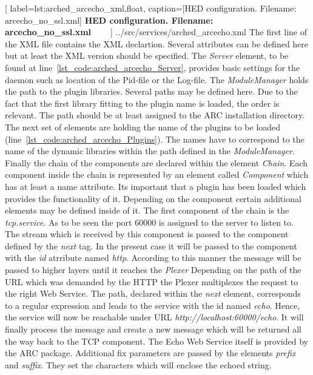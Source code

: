 
	[
	label=lst:arched_arcecho_xml,float,
	caption={[HED configuration. Filename: arcecho\_no\_ssl.xml]
	\textbf{HED configuration. Filename: arcecho\_no\_ssl.xml\textcolor{white}{hmf}}}
	]
{../src/services/arched_arcecho.xml}
The first line of the XML file contains the XML declartion. Several attributes can be defined here but at least the XML version should be specified.  %
The \textit{Server} element, to be found at line~\ref{lst_code:arched_arcecho_Server}, provides basic settings for the daemon such as location of the Pid-file or the Log-file.
The \textit{ModuleManager} holds the path to the plugin libraries. Several paths may be defined here. Due to the fact that the first library fitting to the plugin name is loaded, the order is relevant. The path should be at least assigned to the ARC installation directory. %
The next set of elements are holding the name of the plugins to be loaded (line~\ref{lst_code:arched_arcecho_Plugins}).
The names have to correspond to the name of the dynamic libraries within the path defined in the \textit{ModuleManager}.
Finally the chain of the components are declared within the element \textit{Chain}.
Each component inside the chain is represented by an element called \textit{Component} which has at least a name attribute.
Its important that a plugin has been loaded which provides the functionality of it.
Depending on the component certain additional elements may be defined inside of it.
The first component of the chain is the \textit{tcp.service}. As to be seen the port 60000 is assigned to the server to listen to.
The stream which is received by this component is passed to the component defined by the \textit{next} tag.
In the present case it will be passed to the component with the \textit{id} atrribute named \textit{http}. According to this manner the message will be passed to higher layers until it reaches the \textit{Plexer}  Depending on the path of the URL which was demanded by the HTTP the Plexer multiplexes the request to the right Web Service. The path, declared within the \textit{next} element, corresponds to a regular expression and leads to the service with the id named \textit{echo}. 
Hence, the service will now be reachable under URL \textit{http://localhost:60000/echo}.
It will finally process the message and create a new message which will be returned all the way back to the TCP component. The Echo Web Service itself is provided by the ARC package. Additional fix parameters are passed by the elements \textit{prefix} and \textit{suffix}. They set the characters which will enclose the echoed string. %
\\


